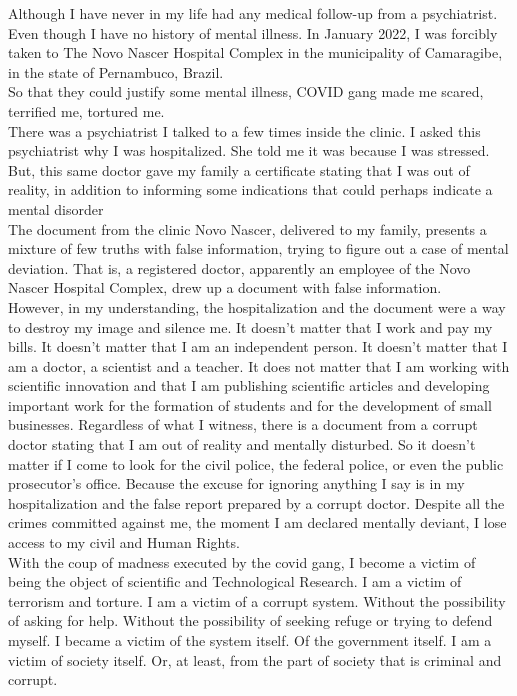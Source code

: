 \documentclass[11pt]{book}
\begin{document}
\noindent Although I have never in my life had any medical follow-up from a psychiatrist. Even though I have no history of mental illness. In January 2022, I was forcibly taken to The Novo Nascer Hospital Complex in the municipality of Camaragibe, in the state of Pernambuco, Brazil. \\

\noindent So that they could justify some mental illness, COVID gang made me scared, terrified me, tortured me. \\

\noindent There was a psychiatrist I talked to a few times inside the clinic. I asked this psychiatrist why I was hospitalized. She told me it was because I was stressed. But, this same doctor gave my family a certificate stating that I was out of reality, in addition to informing some indications that could perhaps indicate a mental disorder \\

\noindent The document from the clinic Novo Nascer, delivered to my family, presents a mixture of few truths with false information, trying to figure out a case of mental deviation. That is, a registered doctor, apparently an employee of the Novo Nascer Hospital Complex, drew up a document with false information. \\

\noindent However, in my understanding, the hospitalization and the document were a way to destroy my image and silence me. It doesn't matter that I work and pay my bills. It doesn't matter that I am an independent person. It doesn't matter that I am a doctor, a scientist and a teacher. It does not matter that I am working with scientific innovation and that I am publishing scientific articles and developing important work for the formation of students and for the development of small businesses. Regardless of what I witness, there is a document from a corrupt doctor stating that I am out of reality and mentally disturbed. So it doesn't matter if I come to look for the civil police, the federal police, or even the public prosecutor's office. Because the excuse for ignoring anything I say is in my hospitalization and the false report prepared by a corrupt doctor. Despite all the crimes committed against me, the moment I am declared mentally deviant, I lose access to my civil and Human Rights. \\

\noindent With the coup of madness executed by the covid gang, I become a victim of being the object of scientific and Technological Research. I am a victim of terrorism and torture. I am a victim of a corrupt system. Without the possibility of asking for help. Without the possibility of seeking refuge or trying to defend myself. I became a victim of the system itself. Of the government itself. I am a victim of society itself. Or, at least, from the part of society that is criminal and corrupt. \\
\end{document}
